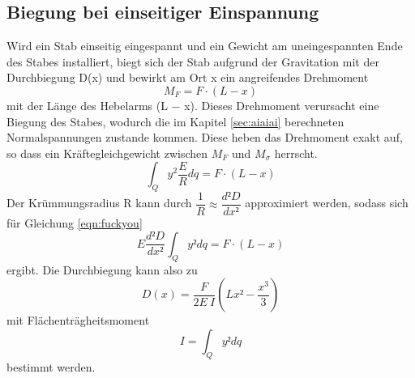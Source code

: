 \subsection{Biegung bei einseitiger Einspannung}
    Wird ein Stab einseitig eingespannt und ein Gewicht am uneingespannten Ende des Stabes 
    installiert, biegt sich der Stab aufgrund der Gravitation mit der Durchbiegung D(x) 
    und bewirkt am Ort x ein angreifendes Drehmoment
    \begin{equation}
        M_F = F \cdot (L − x)
    \end{equation}
    mit der Länge des Hebelarms (L − x).
    Dieses Drehmoment verursacht eine Biegung des Stabes, wodurch die im Kapitel 
    \ref{sec:aiaiai} berechneten Normalspannungen zustande kommen. Diese heben das 
    Drehmoment exakt auf, so dass ein Kräftegleichgewicht zwischen $M_F$ und $M_{\sigma}$ herrscht.
    \begin{equation}
        \int_Q y^2 \dfrac{E}{R}dq  = F \cdot (L − x)
    \end{equation}
    Der Krümmungsradius R kann durch $\dfrac{1}{R} \approx 
    \dfrac{d²D}{dx²}$ approximiert werden, sodass sich für Gleichung \ref{eqn:fuckyou}
    \begin{equation}
        E \dfrac{d²D}{dx²} \int_Q y² dq=F\cdot(L-x)
    \end{equation}
    ergibt. Die Durchbiegung kann also zu
    \begin{equation}
        D(x)=\dfrac{F}{2 E \ I}(Lx²-\dfrac{x^3}{3})
    \end{equation}
    mit Flächenträgheitsmoment
    \begin{equation}
        I = \int_Q y² dq
    \end{equation}
    bestimmt werden.

